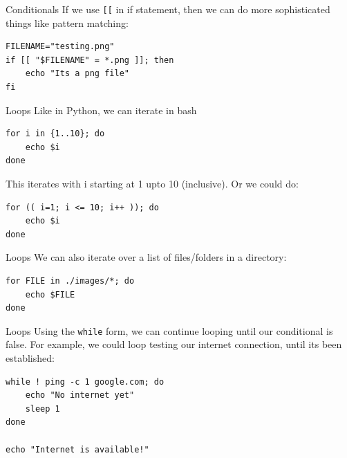 \documentclass[10pt]{beamer}
\begin{document}
\begin{frame}[label={sec:org9621715},fragile]{Conditionals}
 If we use \texttt{[[} in if statement, then we can do more sophisticated things like
pattern matching:

\begin{verbatim}
FILENAME="testing.png"
if [[ "$FILENAME" = *.png ]]; then
    echo "Its a png file"
fi
\end{verbatim}
\end{frame}

\begin{frame}[label={sec:org08623c0},fragile]{Loops}
 Like in Python, we can iterate in bash

\begin{verbatim}
for i in {1..10}; do
    echo $i
done
\end{verbatim}

This iterates with i starting at 1 upto 10 (inclusive). Or we could do:

\begin{verbatim}
for (( i=1; i <= 10; i++ )); do
    echo $i
done
\end{verbatim}
\end{frame}

\begin{frame}[label={sec:org706fad5},fragile]{Loops}
 We can also iterate over a list of files/folders in a directory:

\begin{verbatim}
for FILE in ./images/*; do
    echo $FILE
done
\end{verbatim}
\end{frame}

\begin{frame}[label={sec:orge909afd},fragile]{Loops}
 Using the \texttt{while} form, we can continue looping until our conditional is
false. For example, we could loop testing our internet connection, until its
been established:

\begin{verbatim}
while ! ping -c 1 google.com; do
    echo "No internet yet"
    sleep 1
done

echo "Internet is available!"
\end{verbatim}
\end{frame}
\end{document}

